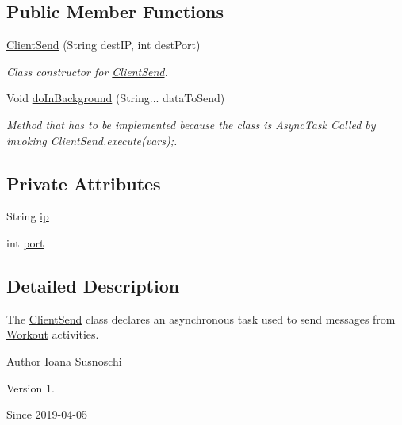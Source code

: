 \subsection*{Public Member Functions}
\begin{DoxyCompactItemize}
\item 
\mbox{\hyperlink{classcom_1_1example_1_1trainawearapplication_1_1_client_send_ab1f011085d4305f586a7074a46e73450}{Client\+Send}} (String dest\+IP, int dest\+Port)
\begin{DoxyCompactList}\small\item\em Class constructor for \mbox{\hyperlink{classcom_1_1example_1_1trainawearapplication_1_1_client_send}{Client\+Send}}. \end{DoxyCompactList}\item 
Void \mbox{\hyperlink{classcom_1_1example_1_1trainawearapplication_1_1_client_send_ad8e0bcd2078b23e83c1060065834ae7d}{do\+In\+Background}} (String... data\+To\+Send)
\begin{DoxyCompactList}\small\item\em Method that has to be implemented because the class is Async\+Task Called by invoking Client\+Send.\+execute(vars);. \end{DoxyCompactList}\end{DoxyCompactItemize}
\subsection*{Private Attributes}
\begin{DoxyCompactItemize}
\item 
String \mbox{\hyperlink{classcom_1_1example_1_1trainawearapplication_1_1_client_send_ad35299d12486a041cdcbcffab3cc320f}{ip}}
\item 
int \mbox{\hyperlink{classcom_1_1example_1_1trainawearapplication_1_1_client_send_a1295f5916c4527127a9dd68b7c6fe759}{port}}
\end{DoxyCompactItemize}


\subsection{Detailed Description}
The \mbox{\hyperlink{classcom_1_1example_1_1trainawearapplication_1_1_client_send}{Client\+Send}} class declares an asynchronous task used to send messages from \mbox{\hyperlink{classcom_1_1example_1_1trainawearapplication_1_1_workout}{Workout}} activities. 

\begin{DoxyAuthor}{Author}
Ioana Susnoschi 
\end{DoxyAuthor}
\begin{DoxyVersion}{Version}
1. 
\end{DoxyVersion}
\begin{DoxySince}{Since}
2019-\/04-\/05 
\end{DoxySince}


